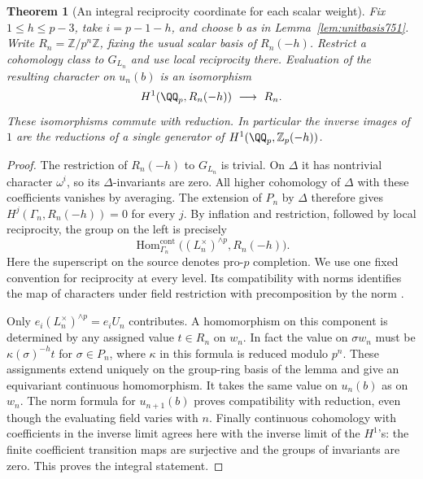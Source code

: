 \documentclass[a4paper,11pt]{article}
\newtheorem{theorem}[proposition]{Theorem}
\theoremstyle{definition}
\theoremstyle{remark}
\newcommand{\ZZ}{\mathbb Z}\newcommand{\ord}{\operatorname{ord}}
\numberwithin{equation}{section}
\begin{document}
\begin{theorem}[An integral reciprocity coordinate for each scalar weight]
\leavevmode\label{thm:unitcoordinate751}
Fix \(1\le h\le p-3\), take \(i=p-1-h\), and choose \(b\) as in
Lemma~\ref{lem:unitbasis751}. Write \(R_n=\ZZ/p^n\ZZ\), fixing
the usual scalar basis of \(R_n(-h)\). Restrict a cohomology
class to \(G_{L_n}\) and use local reciprocity there. Evaluation
of the resulting character on \(u_n(b)\) is an isomorphism
\[
 H^1(\QQ_p,R_n(-h))\ \longrightarrow\ R_n .
\]
These isomorphisms commute with reduction. In particular the
inverse images of \(1\) are the reductions of a single generator
of \(H^1(\QQ_p,\ZZ_p(-h))\).
\end{theorem}
\begin{proof}
The restriction of \(R_n(-h)\) to \(G_{L_n}\) is trivial. On
\(\Delta\) it has nontrivial character \(\omega^i\), so its
\(\Delta\)-invariants are zero. All higher cohomology of
\(\Delta\) with these coefficients vanishes by averaging. The
extension of \(P_n\) by \(\Delta\) therefore gives
\(H^j(\Gamma_n,R_n(-h))=0\) for every \(j\). By inflation and
restriction, followed by local reciprocity, the group on the
left is precisely
\[
 \operatorname{Hom}^{\mathrm{cont}}_{\Gamma_n}
   \big((L_n^\times)^{\wedge p},R_n(-h)\big).
\]
Here the superscript on the source denotes pro-\(p\) completion.
We use one fixed convention for reciprocity at every level.
Its compatibility with norms identifies the map of characters
under field restriction with precomposition by the norm
\cite{III-II-V-cft101}.

Only \(e_i(L_n^\times)^{\wedge p}=e_iU_n\) contributes. A
homomorphism on this component is determined by any assigned
value \(t\in R_n\) on \(w_n\). In fact the value on \(\sigma w_n\)
must be \(\kappa(\sigma)^{-h}t\) for \(\sigma\in P_n\), where
\(\kappa\) in this formula is reduced modulo \(p^n\). These
assignments extend uniquely on the group-ring basis of the
lemma and give an equivariant continuous homomorphism. It takes
the same value on \(u_n(b)\) as on \(w_n\). The norm formula
for \(u_{n+1}(b)\) proves compatibility with reduction, even
though the evaluating field varies with \(n\). Finally continuous
cohomology with coefficients in the inverse limit agrees here
with the inverse limit of the \(H^1\)'s: the finite coefficient
transition maps are surjective and the groups of invariants
are zero. This proves the integral statement.
\end{proof}
\end{document}
